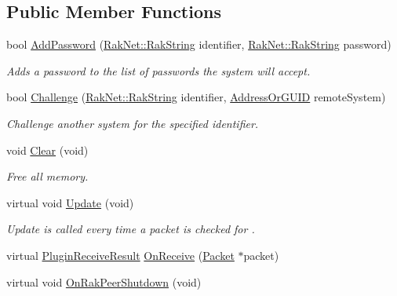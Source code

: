 \subsection*{Public Member Functions}
\begin{DoxyCompactItemize}
\item 
bool \hyperlink{class_rak_net_1_1_two_way_authentication_af3168d8bfabeb0fd17008e514a24736b}{Add\-Password} (\hyperlink{class_rak_net_1_1_rak_string}{Rak\-Net\-::\-Rak\-String} identifier, \hyperlink{class_rak_net_1_1_rak_string}{Rak\-Net\-::\-Rak\-String} password)
\begin{DoxyCompactList}\small\item\em Adds a password to the list of passwords the system will accept. \end{DoxyCompactList}\item 
bool \hyperlink{class_rak_net_1_1_two_way_authentication_aa2e65f464fc887dc753a351e7e9fb797}{Challenge} (\hyperlink{class_rak_net_1_1_rak_string}{Rak\-Net\-::\-Rak\-String} identifier, \hyperlink{struct_rak_net_1_1_address_or_g_u_i_d}{Address\-Or\-G\-U\-I\-D} remote\-System)
\begin{DoxyCompactList}\small\item\em Challenge another system for the specified identifier. \end{DoxyCompactList}\item 
\hypertarget{class_rak_net_1_1_two_way_authentication_ad66d0d154535ef461f3ba6be4ac3e14d}{void \hyperlink{class_rak_net_1_1_two_way_authentication_ad66d0d154535ef461f3ba6be4ac3e14d}{Clear} (void)}\label{class_rak_net_1_1_two_way_authentication_ad66d0d154535ef461f3ba6be4ac3e14d}

\begin{DoxyCompactList}\small\item\em Free all memory. \end{DoxyCompactList}\item 
\hypertarget{class_rak_net_1_1_two_way_authentication_a09f52ebca8a86540a1270a76027e9503}{virtual void \hyperlink{class_rak_net_1_1_two_way_authentication_a09f52ebca8a86540a1270a76027e9503}{Update} (void)}\label{class_rak_net_1_1_two_way_authentication_a09f52ebca8a86540a1270a76027e9503}

\begin{DoxyCompactList}\small\item\em Update is called every time a packet is checked for . \end{DoxyCompactList}\item 
virtual \hyperlink{group___p_l_u_g_i_n___i_n_t_e_r_f_a_c_e___g_r_o_u_p_ga89998adaafb29e5d879113b992161085}{Plugin\-Receive\-Result} \hyperlink{class_rak_net_1_1_two_way_authentication_a692b2d35df56e4a4c0550808d67864cc}{On\-Receive} (\hyperlink{struct_rak_net_1_1_packet}{Packet} $\ast$packet)
\item 
\hypertarget{class_rak_net_1_1_two_way_authentication_a21174af5198820e661c3c8ea1bf5c599}{virtual void \hyperlink{class_rak_net_1_1_two_way_authentication_a21174af5198820e661c3c8ea1bf5c599}{On\-Rak\-Peer\-Shutdown} (void)}\label{class_rak_net_1_1_two_way_authentication_a21174af5198820e661c3c8ea1bf5c599}


\end{DoxyCompactItemize}
